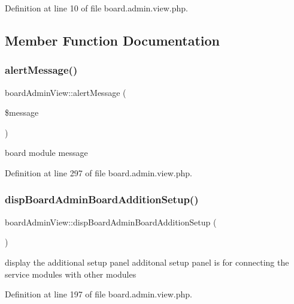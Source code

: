 Definition at line 10 of file board.\+admin.\+view.\+php.



\subsection{Member Function Documentation}
\hypertarget{classboardAdminView_ad999a21f3d2a33b2d503fb8cb7ecdd53}{}\label{classboardAdminView_ad999a21f3d2a33b2d503fb8cb7ecdd53} 
\subsubsection{\texorpdfstring{alert\+Message()}{alertMessage()}}
{\footnotesize\ttfamily board\+Admin\+View\+::alert\+Message (\begin{DoxyParamCaption}\item[{}]{\$message }\end{DoxyParamCaption})}



board module message 



Definition at line 297 of file board.\+admin.\+view.\+php.

\hypertarget{classboardAdminView_a684dcfc8eba6453f2de80730f32f364f}{}\label{classboardAdminView_a684dcfc8eba6453f2de80730f32f364f} 
\subsubsection{\texorpdfstring{disp\+Board\+Admin\+Board\+Addition\+Setup()}{dispBoardAdminBoardAdditionSetup()}}
{\footnotesize\ttfamily board\+Admin\+View\+::disp\+Board\+Admin\+Board\+Addition\+Setup (\begin{DoxyParamCaption}{ }\end{DoxyParamCaption})}



display the additional setup panel additonal setup panel is for connecting the service modules with other modules 



Definition at line 197 of file board.\+admin.\+view.\+php.

